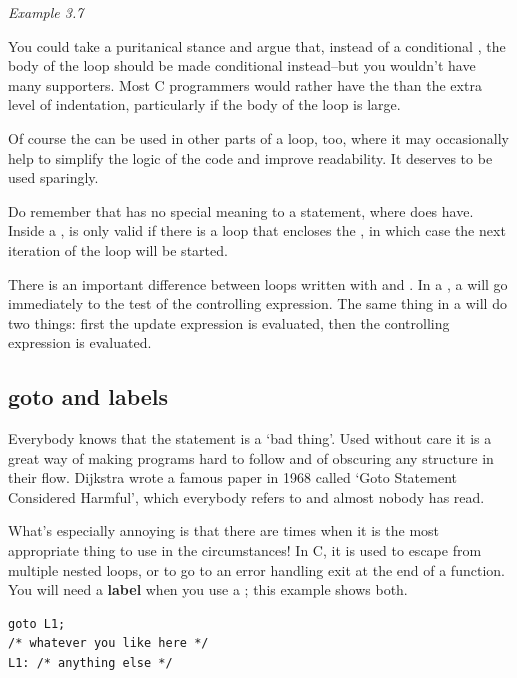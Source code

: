     \begin{center}\textit{Example 3.7}\end{center}


   You could take a puritanical stance and argue that, instead of a
    conditional \continue, the body of the loop should be made
    conditional instead--but you wouldn't have many supporters. Most C
    programmers would rather have the \continue{} than the extra
    level of indentation, particularly if the body of the loop is large.


   Of course the \continue{} can be used in other parts of a
    loop, too, where it may occasionally help to simplify the logic of the
    code and improve readability. It deserves to be used sparingly.


   Do remember that \continue{} has no special meaning to a
    \switch{} statement, where \kbreak{} does have. Inside
    a \switch, \continue{} is only valid if there is a
    loop that encloses the \switch, in which case the next
    iteration of the loop will be started.


   There is an important difference between loops written with
    \while{} and \for. In a \while, a
    \continue{} will go immediately to the test of the controlling expression.
    The same thing in a \for{} will do two things: first the update
    expression is evaluated, then the controlling expression is evaluated.


  

  \subsection{goto and labels}
   

   Everybody knows that the \goto{} statement is a `bad
    thing'. Used without care it is a great way of making programs hard to
    follow and of obscuring any structure in their flow. Dijkstra wrote a
    famous paper in 1968 called `Goto Statement Considered Harmful',
    which everybody refers to and almost nobody has read.


   What's especially annoying is that there are times when it is the most
    appropriate thing to use in the circumstances! In C, it is used to
    escape from multiple nested loops, or to go to an error handling exit at
    the end of a function. You will need a \textbf{label} when you use a
    \goto{}; this example shows both.


   \begin{Verbatim}
goto L1;
/* whatever you like here */
L1: /* anything else */
\end{Verbatim}

